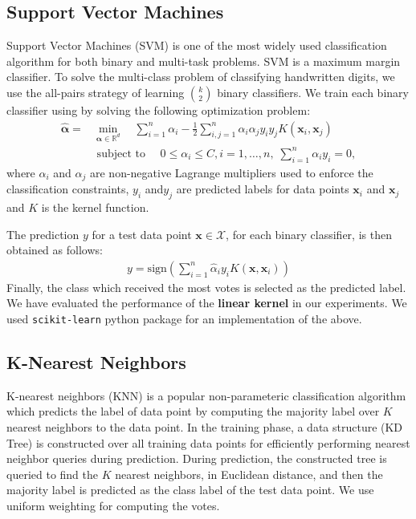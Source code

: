 \documentclass[10pt]{scrartcl}
\newcommand{\R}{\mathbb{R}}                       %
\newcommand{\vx}{\mathbf{x}}                        %
\newcommand{\dX}{\mathcal{X}}                     %
\newcommand{\valpha}{\boldsymbol{\alpha}}  %
\begin{document}
\subsection*{Support Vector Machines}
Support Vector Machines (SVM) is one of the most widely used classification algorithm for both binary and multi-task problems.
SVM is a maximum margin classifier. To solve the multi-class problem of classifying handwritten digits, we use the all-pairs strategy
of learning ${k \choose 2}$ binary classifiers. We train each binary classifier using by solving the following optimization problem:
\begin{align*}
\hat{\valpha} = 
& \min_{\valpha \in \R^d}  \quad \sum_{i=1}^{n} \alpha_i - \frac{1}{2} \sum_{i,j=1}^{n} \alpha_i \alpha_j y_i y_j K(\vx_i,\vx_j) \\ 
& \text{ subject to } \quad  0 \leq \alpha_i \leq C, i=1,\ldots,n, \;  \sum_{i=1}^{n} \alpha_i y_i = 0,
\end{align*}
where $\alpha_i$ and $\alpha_j$ are non-negative Lagrange multipliers  used to enforce the classification constraints, 
$y_i$ and$y_j$ are predicted labels for data points $\vx_i$  and $\vx_j$ and $K$ is the kernel function.  

The prediction $y$ for a test data point $\vx \in \dX$, for each binary classifier, is then obtained as follows:
\begin{align*}
y = \mathrm{sign} \left( \sum_{i=1}^n \hat{\alpha}_i y_i K(\vx, \vx_i) \right)
\end{align*}
Finally, the class which received the most votes is selected as the predicted label. We have evaluated the performance of the \textbf{linear kernel}
in our experiments. We used \texttt{scikit-learn} python package for an implementation of the above.

\subsection*{K-Nearest Neighbors}
K-nearest neighbors (KNN) is a popular non-parameteric classification algorithm which predicts the label of data point
by computing the majority label over $K$ nearest neighbors to the data point. In the training phase, 
a data structure (KD Tree) is constructed over all training data points for efficiently performing nearest neighbor queries during prediction.
During prediction, the constructed tree is queried to find the $K$ nearest neighbors, in Euclidean distance,
 and then the majority label is predicted as the class label of the test data point. We use uniform weighting for computing the votes.
\end{document}
